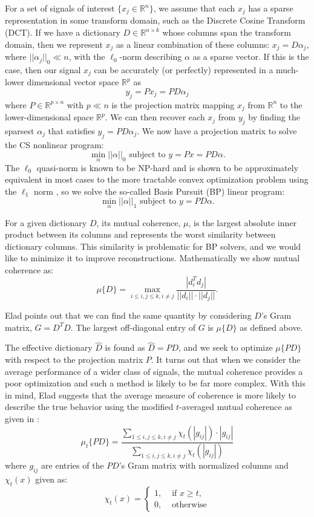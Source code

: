 \documentclass[journal]{IEEEtran}
\begin{document}
For a set of signals of interest $\{x_j \in \mathbb{R}^n\}$, we assume that each $x_j$ has a sparse representation in some transform domain, such as the Discrete Cosine Transform (DCT).  If we have a dictionary $D \in \mathbb{R}^{n\times k}$ whose columns span the transform domain, then we represent $x_j$ as a linear combination of these columns: $x_j = D\alpha_j$, where $||\alpha_j||_0 \ll n$, with the $\ell_0$-norm describing $\alpha$ as a sparse vector.  If this is the case, then our signal $x_j$ can be accurately (or perfectly) represented in a much-lower dimensional vector space $\mathbb{R}^p$ as $$y_j = Px_j=PD\alpha_j$$ where $P \in \mathbb{R}^{p\times n}$ with $p \ll n$ is the projection matrix mapping $x_j$ from $\mathbb{R}^n$ to the lower-dimensional space $\mathbb{R}^p$.  We can then recover each $x_j$ from $y_j$ by finding the sparsest $\alpha_j$ that satisfies $y_j = PD\alpha_j$.  We now have a projection matrix to solve the CS nonlinear program: $$ \min_\alpha ||\alpha||_0 \mbox{ subject to } y = Px = PD\alpha.$$  The $\ell_0$ quasi-norm is known to be NP-hard and is shown to be approximately equivalent in most cases to the more tractable convex optimization problem using the $\ell_1$ norm \cite{convexoptimization}, so we solve the so-called Basis Pursuit (BP) linear program: $$ \min_\alpha ||\alpha||_1 \mbox{ subject to } y = PD\alpha .$$

For a given dictionary $D$, its mutual coherence, $\mu$, is the largest absolute inner product between its columns and represents the worst similarity between dictionary columns.  This similarity is problematic for BP solvers, and we would like to minimize it to improve reconstructions.  Mathematically we show mutual coherence as: $$ \mu\{D\} = \max_{i \leq i,j \leq k, i \neq j} \frac{| d_i^Td_j |}{|| d_i || \cdot || d_j ||}. $$

Elad points out that we can find the same quantity by considering $D$'s Gram matrix, $G = D^TD$.  The largest off-diagonal entry of $G$ is $\mu\{D\}$ as defined above.

The effective dictionary $\hat{D}$ is found as $ \hat{D} = PD$, and we seek to optimize $\mu\{PD\}$ with respect to the projection matrix $P$.  It turns out that when we consider the average performance of a wider class of signals, the mutual coherence provides a poor optimization and such a method is likely to be far more complex.  With this in mind, Elad suggests that the average measure of coherence is more likely to describe the true behavior using the modified $t$-averaged mutual coherence as given in \cite{lin}: $$ \mu_t\{PD\} = \frac{ \sum_{1 \leq i,j \leq k, i \neq j} \chi_t(| g_{ij}|) \cdot | g_{ij} | }{ \sum_{1 \leq i,j \leq k, i \neq j} \chi_t(|g_{ij}|)} $$ where $g_{ij}$ are entries of the $PD$'s Gram matrix with normalized columns and $\chi_t(x)$ given as: $$ \chi_t(x) = \begin{cases}  1, & \mbox{ if } x \geq t, \\  0, & \mbox{ otherwise} \end{cases}$$
\end{document}
